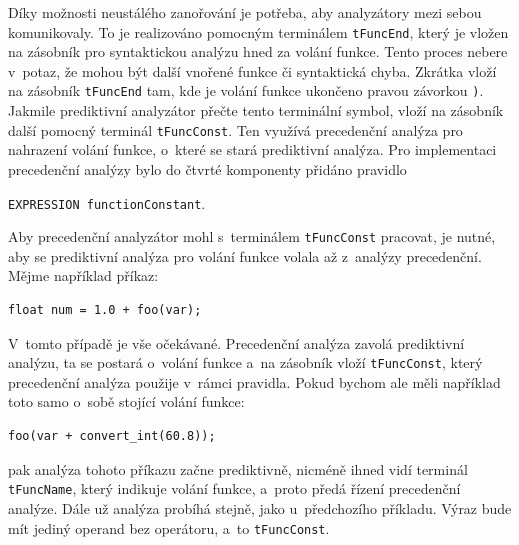 Díky možnosti neustálého zanořování je potřeba, aby analyzátory mezi sebou komunikovaly.
To je realizováno pomocným terminálem \texttt{tFuncEnd}, který je vložen na zásobník pro syntaktickou analýzu hned za volání funkce.
Tento proces nebere v~potaz, že mohou být další vnořené funkce či syntaktická chyba.
Zkrátka vloží na zásobník \texttt{tFuncEnd} tam, kde je volání funkce ukončeno pravou závorkou \texttt{)}.
Jakmile prediktivní analyzátor přečte tento terminální symbol, vloží na zásobník další pomocný terminál \texttt{tFuncConst}.
Ten využívá precedenční analýza pro nahrazení volání funkce, o~které se stará prediktivní analýza.
Pro implementaci precedenční analýzy bylo do čtvrté komponenty přidáno pravidlo
\begin{center}
    \texttt{EXPRESSION \textrightarrow{} functionConstant}.
\end{center}

Aby precedenční analyzátor mohl s~terminálem \texttt{tFuncConst} pracovat, je nutné, aby se prediktivní analýza pro volání funkce volala až z~analýzy precedenční.
Mějme například příkaz:
\begin{lstlisting}[language=Koubp]
    float num = 1.0 + foo(var);
\end{lstlisting}
V~tomto případě je vše očekávané.
Precedenční analýza zavolá prediktivní analýzu, ta se postará o~volání funkce a~na zásobník vloží \texttt{tFuncConst}, který precedenční analýza použije v~rámci pravidla.
Pokud bychom ale měli například toto samo o~sobě stojící volání funkce:
\begin{lstlisting}[language=Koubp]
    foo(var + convert_int(60.8));
\end{lstlisting}
pak analýza tohoto příkazu začne prediktivně, nicméně ihned vidí terminál \texttt{tFuncName}, který indikuje volání funkce, a~proto předá řízení precedenční analýze.
Dále už analýza probíhá stejně, jako u~předchozího příkladu. 
Výraz bude mít jediný operand bez operátoru, a~to \texttt{tFuncConst}.

